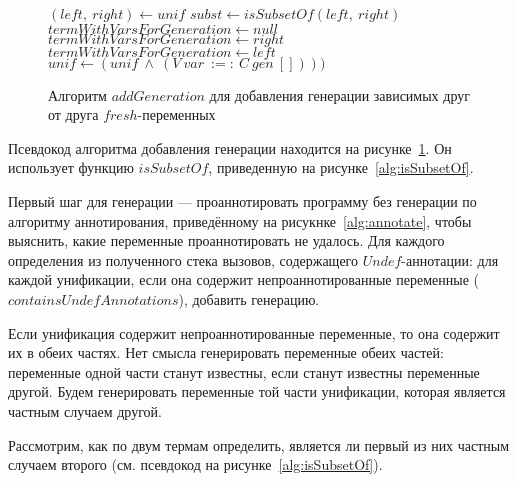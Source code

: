 \begin{figure}[h!]
  \begin{center}
  \begin{minipage}{1.1\textwidth}
\begin{algorithm}[H]
   {
     {
       {
        $(left,~right) \gets unif$\;
        $subst \gets isSubsetOf(left,~right)$\;
        $termWithVarsForGeneration \gets null$\;
         {
          $termWithVarsForGeneration \gets right$
        } {
          $termWithVarsForGeneration \gets left$
        }
         {
           {
            $unif \gets (unif~\wedge~(V~var~:=:~C~gen~[])))$
          }
        }
        \KwBreak
      }
    }
  }
\end{algorithm}
  \end{minipage}
  \end{center}
  \caption{Алгоритм $addGeneration$ для добавления генерации зависимых друг от друга $fresh$-переменных}
  \label{alg:addGeneration}
\end{figure}

Псевдокод алгоритма добавления генерации находится на рисунке~\ref{alg:addGeneration}.
Он использует функцию $isSubsetOf$, приведенную на рисунке~\ref{alg:isSubsetOf}.

Первый шаг для генерации --- проаннотировать программу без генерации по алгоритму аннотирования, приведённому на рисукнке~\ref{alg:annotate}, чтобы выяснить, какие переменные проаннотировать не удалось.
Для каждого определения из полученного стека вызовов, содержащего $Undef$-аннотации: для каждой унификации, если она содержит непроаннотированные переменные ($containsUndefAnnotations$), добавить генерацию.

Если унификация содержит непроаннотированные переменные, то она содержит их в обеих частях.
Нет смысла генерировать переменные обеих частей: переменные одной части станут известны, если станут известны переменные другой.
Будем генерировать переменные той части унификации, которая является частным случаем другой.

Рассмотрим, как по двум термам определить, является ли первый из них частным случаем второго (см. псевдокод на рисунке~\ref{alg:isSubsetOf}).

